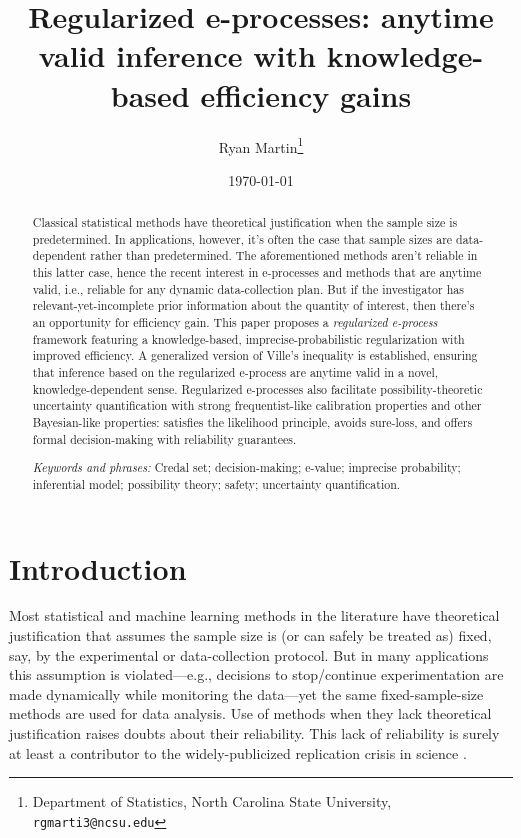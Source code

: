 \documentclass[a4paper, 12pt]{article}
\title{Regularized e-processes: anytime valid inference with knowledge-based efficiency gains}
\author{Ryan Martin\footnote{Department of Statistics, North Carolina State University, {\tt rgmarti3@ncsu.edu}}
}
\date{\today}
\theoremstyle{plain}
\theoremstyle{definition}
\theoremstyle{remark}
\begin{document}
\maketitle 

\begin{abstract}
Classical statistical methods have theoretical justification when the sample size is predetermined.  In applications, however, it's often the case that sample sizes are data-dependent rather than predetermined.  The aforementioned methods aren't reliable in this latter case, hence the recent interest in e-processes and methods that are anytime valid, i.e., reliable for any dynamic data-collection plan.  But if the investigator has relevant-yet-incomplete prior information about the quantity of interest, then there's an opportunity for efficiency gain.  This paper proposes a {\em regularized e-process} framework featuring a knowledge-based, imprecise-probabilistic regularization with improved efficiency.  A generalized version of Ville's inequality is established, ensuring that inference based on the regularized e-process are anytime valid in a novel, knowledge-dependent sense.  Regularized e-processes also facilitate possibility-theoretic uncertainty quantification with strong frequentist-like calibration properties and other Bayesian-like properties: satisfies the likelihood principle, avoids sure-loss, and offers formal decision-making with reliability guarantees. 

\smallskip

\emph{Keywords and phrases:} Credal set; decision-making; e-value; imprecise probability; inferential model; possibility theory; safety; uncertainty quantification. 
\end{abstract}




\section{Introduction}
\label{S:intro}

Most statistical and machine learning methods in the literature have theoretical justification that assumes the sample size is (or can safely be treated as) fixed, say, by the experimental or data-collection protocol.  But in many applications this assumption is violated---e.g., decisions to stop/continue experimentation are made dynamically while monitoring the data---yet the same fixed-sample-size methods are used for data analysis.  Use of methods when they lack theoretical justification raises doubts about their reliability.  This lack of reliability is surely at least a contributor to the widely-publicized replication crisis in science \citep[e.g.,][]{nuzzo2014, baker.nature.2016, camerer2018}.  
\end{document}
